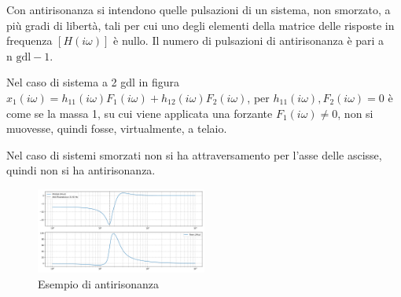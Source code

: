 \label{antirisonanza}
Con antirisonanza si intendono quelle pulsazioni di un sistema, non smorzato, a più gradi di libertà, tali per cui uno degli elementi della matrice delle risposte in frequenza \(\left[ H(i\omega) \right]\) è nullo.
Il numero di pulsazioni di antirisonanza è pari a \(\text{n gdl} - 1\).

Nel caso di sistema a 2 gdl in figura  \( x_1(i\omega) = h_{11}(i\omega) F_1(i\omega) + h_{12}(i\omega)F_2(i\omega) \), per \( h_{11}(i\omega), F_2(i\omega) = 0\) è come se la massa 1, su cui viene applicata una forzante \(F_1(i\omega)\neq 0\), non si muovesse, quindi fosse, virtualmente, a telaio.

Nel caso di sistemi smorzati non si ha attraversamento per l'asse delle ascisse, quindi non si ha antirisonanza.

\begin{figure}[h]
    \centering
    \includegraphics[width=0.5\textwidth]{Immagini/esempio_antirisonanza.png}
    \caption{Esempio di antirisonanza}
\end{figure}



